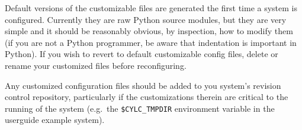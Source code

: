 Default versions of the customizable files are generated the first time
a system is configured. Currently they are raw Python source modules,
but they are very simple and it should be reasonably obvious, by
inspection, how to modify them (if you are not a Python programmer, be
aware that indentation is important in Python).  If you wish to revert
to default customizable config files, delete or rename your customized
files before reconfiguring.

Any customized configuration files should be added to you system's
revision control repository, particularly if the customizations
therein are critical to the running of the system (e.g.\ the
\lstinline=$CYLC_TMPDIR= environment variable in the userguide example
system).
